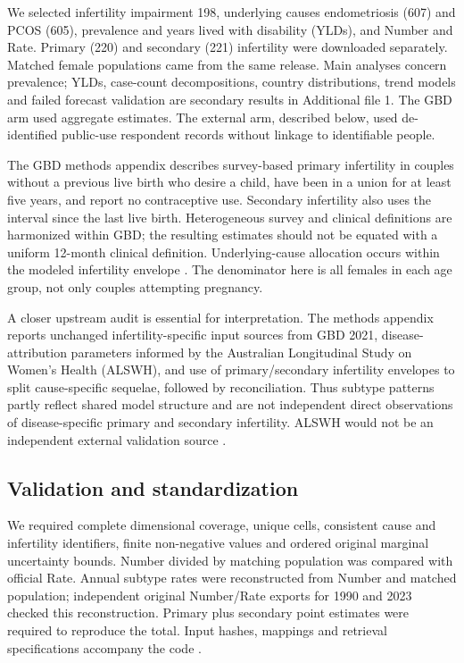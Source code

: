 \documentclass[11pt,a4paper]{article}
\begin{document}
We selected infertility impairment 198, underlying causes endometriosis (607) and PCOS (605), prevalence and years lived with disability (YLDs), and Number and Rate. Primary (220) and secondary (221) infertility were downloaded separately. Matched female populations came from the same release. Main analyses concern prevalence; YLDs, case-count decompositions, country distributions, trend models and failed forecast validation are secondary results in Additional file 1. The GBD arm used aggregate estimates. The external arm, described below, used de-identified public-use respondent records without linkage to identifiable people.

The GBD methods appendix describes survey-based primary infertility in couples without a previous live birth who desire a child, have been in a union for at least five years, and report no contraceptive use. Secondary infertility also uses the interval since the last live birth. Heterogeneous survey and clinical definitions are harmonized within GBD; the resulting estimates should not be equated with a uniform 12-month clinical definition. Underlying-cause allocation occurs within the modeled infertility envelope \cite{gbd}. The denominator here is all females in each age group, not only couples attempting pregnancy.

A closer upstream audit is essential for interpretation. The methods appendix reports unchanged infertility-specific input sources from GBD 2021, disease-attribution parameters informed by the Australian Longitudinal Study on Women's Health (ALSWH), and use of primary/secondary infertility envelopes to split cause-specific sequelae, followed by reconciliation. Thus subtype patterns partly reflect shared model structure and are not independent direct observations of disease-specific primary and secondary infertility. ALSWH would not be an independent external validation source \cite{gbd}.

\subsection{Validation and standardization}
We required complete dimensional coverage, unique cells, consistent cause and infertility identifiers, finite non-negative values and ordered original marginal uncertainty bounds. Number divided by matching population was compared with official Rate. Annual subtype rates were reconstructed from Number and matched population; independent original Number/Rate exports for 1990 and 2023 checked this reconstruction. Primary plus secondary point estimates were required to reproduce the total. Input hashes, mappings and retrieval specifications accompany the code \cite{repository}.
\end{document}
